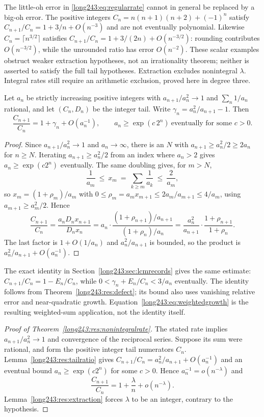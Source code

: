 \documentclass[11pt]{article}
\begin{document}
The little-oh error in \eqref{long243:eq:regularrate} cannot in general
be replaced by a big-oh error. The positive integers
$C_n=n(n+1)(n+2)+(-1)^n$ satisfy $C_{n+1}/C_n=1+3/n+O(n^{-3})$ and are not
eventually polynomial.
Likewise $C_n=\lceil n^{3/2}\rceil$ satisfies
$C_{n+1}/C_n=1+3/(2n)+O(n^{-3/2})$: rounding contributes
$O(n^{-3/2})$, while the unrounded ratio has error $O(n^{-2})$.
These scalar examples obstruct weaker extraction hypotheses, not an
irrationality theorem; neither is asserted to satisfy the full tail
hypotheses. Extraction excludes nonintegral $\lambda$. Integral rates
still require an arithmetic exclusion, proved here in degree three.

\begin{lemma}\label{long243:res:tailratio}
Let $a_n$ be strictly increasing positive integers with $a_{n+1}/a_n^2\to1$ and
$\sum_n1/a_n$ rational, and let $(C_n,D_n)$ be the integer tail.
Write $\gamma_n=a_n^2/a_{n+1}-1$.  Then
\[
 \frac{C_{n+1}}{C_n}=1+\gamma_n+O(a_n^{-1}),
 \qquad a_n\ge\exp(c\,2^n)\ \text{eventually for some }c>0 .
\]
\end{lemma}

\begin{proof}
Since $a_{n+1}/a_n^2\to1$ and $a_n\to\infty$, there is an $N$ with
$a_{n+1}\ge a_n^2/2\ge2a_n$ for $n\ge N$.  Iterating $a_{n+1}\ge a_n^2/2$ from
an index where $a_n>2$ gives $a_n\ge\exp(c2^n)$ eventually.  The same doubling
gives, for $m>N$,
\[
 \frac1{a_m}\ \le\ x_m\ =\ \sum_{k\ge m}\frac1{a_k}\ \le\ \frac2{a_m},
\]
so $x_{m}=(1+\rho_{m})/a_{m}$ with
$0\le\rho_{m}=a_mx_{m+1}\le 2a_m/a_{m+1}\le4/a_m$, using
$a_{m+1}\ge a_m^2/2$.  Hence
\[
 \frac{C_{n+1}}{C_n}=\frac{a_nD_nx_{n+1}}{D_nx_n}
 =a_n\cdot\frac{(1+\rho_{n+1})/a_{n+1}}{(1+\rho_n)/a_n}
 =\frac{a_n^2}{a_{n+1}}\cdot\frac{1+\rho_{n+1}}{1+\rho_n}.
\]
The last factor is $1+O(1/a_n)$ and $a_n^2/a_{n+1}$ is bounded, so the product
is $a_n^2/a_{n+1}+O(a_n^{-1})$.
\end{proof}

The exact identity in Section~\ref{long243:sec:lcmrecords} gives the same
estimate: $C_{n+1}/C_n=1-E_n/C_n$, while
$0<\gamma_n+E_n/C_n<3/a_n$ eventually. The identity follows from
Theorem~\ref{long243:res:defect}; its bound also uses vanishing relative
error and near-quadratic growth. Equation~\eqref{long243:eq:weightedgrowth}
is the resulting weighted-sum application, not the identity itself.

\begin{proof}[Proof of Theorem~\ref{long243:res:nonintegralrate}]
The stated rate implies $a_{n+1}/a_n^2\to1$ and convergence of the
reciprocal series. Suppose its sum were rational, and form the positive
integer tail numerators $C_n$. Lemma~\ref{long243:res:tailratio} gives
$C_{n+1}/C_n=a_n^2/a_{n+1}+O(a_n^{-1})$ and an eventual bound
$a_n\ge\exp(c2^n)$ for some $c>0$. Hence $a_n^{-1}=o(n^{-\lambda})$ and
\[
 \frac{C_{n+1}}{C_n}=1+\frac{\lambda}{n}+o(n^{-\lambda}).
\]
Lemma~\ref{long243:res:extraction} forces $\lambda$ to be an integer,
contrary to the hypothesis.
\end{proof}
\end{document}
